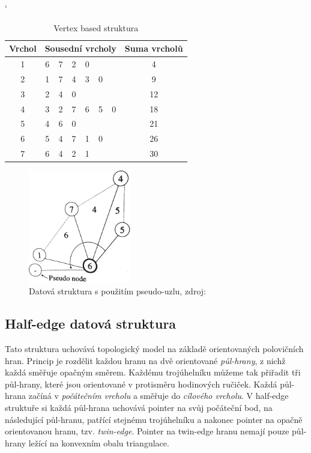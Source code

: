 \documentclass[12pt,a4paper]{article}
\begin{document}
\begin{table}[h]
\catcode`
\begin{tabular}{|c||c|c|c|c|c|c||c|}
\hline
Vrchol & \multicolumn{6}{|c|}{Sousední vrcholy} & Suma vrcholů \\ \hline \hline
1      & 6    & 7    & 2    & 0    &     &     & 4            \\ \hline
2      & 1    & 7    & 4    & 3    & 0   &     & 9            \\ \hline
3      & 2    & 4    & 0    &      &     &     & 12           \\ \hline
4      & 3    & 2    & 7    & 6    & 5   & 0   & 18           \\ \hline
5      & 4    & 6    & 0    &      &     &     & 21           \\ \hline
6      & 5    & 4    & 7    & 1    & 0   &     & 26           \\ \hline
7      & 6    & 4    & 2    & 1    &     &     & 30           \\ \hline
\end{tabular}
\caption{Vertex based struktura}
\label{tab:vertex_based}
\end{table}

\begin{figure}[h!]
\centering
\includegraphics[width=0.4\textwidth]{img/pseudo_node.png}
\caption{Datová struktura s použitím pseudo-uzlu, zdroj: \cite{triangulation}}
\label{fig:pseudo_node}
\end{figure}

\newpage
\subsection{Half-edge datová struktura}
\label{subsec:HE_struct}

Tato struktura uchovává topologický model na základě orientovaných polovičních hran. Princip je rozdělit každou hranu na dvě orientované \emph{půl-hrany}, z nichž každá směřuje opačným směrem. Každému trojúhelníku můžeme tak přiřadit tři půl-hrany, které jsou orientované v protisměru hodinových ručiček. Každá půl-hrana začíná v \emph{počátečním vrcholu} a směřuje do \emph{cílového vrcholu}. V half-edge struktuře si každá půl-hrana uchovává pointer na svůj počáteční bod, na následující půl-hranu, patřící stejnému trojúhelníku a nakonec pointer na opačně orientovanou hranu, tzv. \emph{twin-edge}. Pointer na twin-edge hranu nemají pouze půl-hrany ležící na konvexním obalu triangulace.
\end{document}
